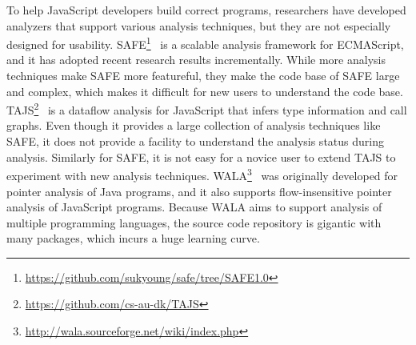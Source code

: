 \documentclass[10pt, conference]{IEEEtran}
\newcommand{\mtt}[1]{\texttt{\small #1}}
\begin{document}
To help JavaScript developers build correct programs, researchers
have developed analyzers that support various analysis techniques,
but they are not especially designed for usability.
SAFE\footnote{\url{https://github.com/sukyoung/safe/tree/SAFE1.0}}~\cite{Lee12}
is a scalable analysis framework for ECMAScript, and it has adopted recent research results incrementally.
While more analysis techniques make SAFE more featureful,
they make the code base of SAFE large and complex, which makes it
difficult for new users to understand the code base.
TAJS\footnote{\url{https://github.com/cs-au-dk/TAJS}}~\cite{TAJSDETER}
is a dataflow analysis for JavaScript that infers type information and call graphs.
Even though it provides a large collection of analysis techniques like SAFE,
it does not provide a facility to understand the analysis status during analysis.
Similarly for SAFE, it is not easy for a novice user to extend TAJS to
experiment with new analysis techniques.
%
WALA\footnote{\url{http://wala.sourceforge.net/wiki/index.php}}~\cite{Schafer13}
was originally developed for pointer analysis of Java programs, and it
also supports flow-insensitive pointer analysis of JavaScript programs.
Because WALA aims to support analysis of multiple programming languages,
the source code repository is gigantic with many packages,
which incurs a huge learning curve.
\end{document}
